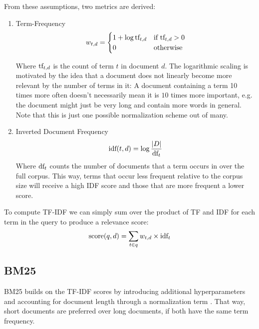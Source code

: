 From these assumptions, two metrics are derived:
\begin{enumerate}
    \item Term-Frequency
          \begin{equation}
              w_{t,d} = \begin{cases}
                  1 + \log \text{tf}_{t, d} & \text{if } \text{tf}_{t, d} > 0 \\
                  0                       & \text{otherwise}              \\
              \end{cases}
          \end{equation}

          Where $\text{tf}_{t, d}$ is the count of term $t$ in document $d$. The logarithmic scaling is motivated by the idea that a document does not linearly become more relevant by the number of terms in it: A document containing a term 10 times more often doesn't necessarily mean it is $10$ times more important, e.g. the document might just be very long and contain more words in general. Note that this is just one possible normalization scheme out of many.

    \item Inverted Document Frequency
          \begin{equation}
              \text{idf}(t, d) = \log \frac{|D|}{\text{df}_t}
          \end{equation}
          Where $\text{df}_t$ counts the number of documents that a term occurs in over the full corpus. This way, terms that occur less frequent relative to the corpus size will receive a high IDF score and those that are more frequent a lower score.

\end{enumerate}

\begin{table}

\end{table}
To compute TF-IDF we can simply sum over the product of TF and IDF for each term in the query to produce a relevance score:
\begin{equation}
    \text{score}(q, d) = \sum_{t \in q} w_{t,d} \times \text{idf}_t
\end{equation}

\subsection{BM25}
\label{sec:bm25}
BM25 builds on the TF-IDF scores  by introducing additional hyperparameters and accounting for document length through a normalization term \cite{robertson2009probabilistic}. That way, short documents are preferred over long documents, if both have the same term frequency.

